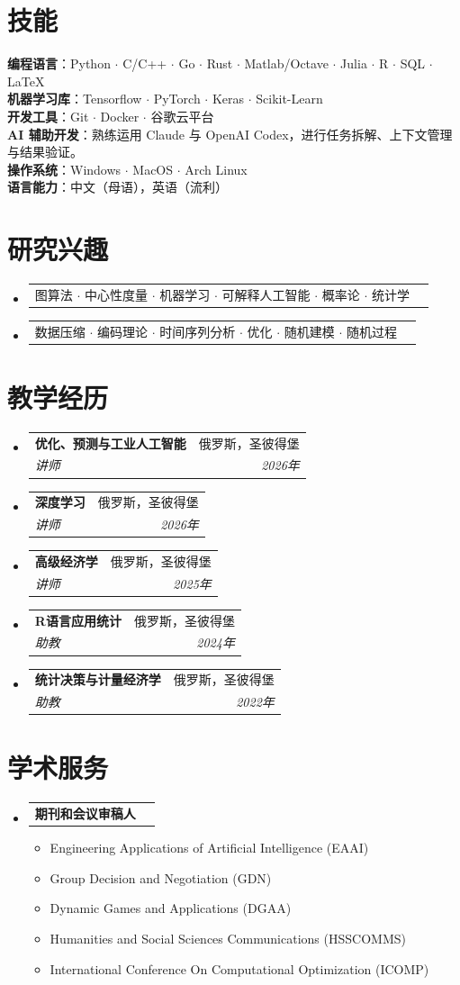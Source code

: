 \documentclass[letterpaper,10pt,fontset=none]{ctexart}
\makeatletter
\newcommand{\resumeItem}[1]{
  \item\small{
    {#1 \vspace{-2pt}}
  }
}
\newcommand{\resumeSubheading}[4]{
  \vspace{-2pt}\item
  \begin{tabular*}{0.97\textwidth}[t]{l@{\extracolsep{\fill}}r}
    \textbf{#1} & #2 \\
    \textit{\small#3} & \textit{\small #4} \\
  \end{tabular*}\vspace{-7pt}
}
\newcommand{\resumeProjectHeading}[2]{
  \item
  \begin{tabular*}{0.97\textwidth}{l@{\extracolsep{\fill}}r}
    \small#1 & #2 \\
  \end{tabular*}\vspace{-7pt}
}
\newenvironment{resumeSubHeadingList}{\begin{itemize}[leftmargin=0.15in, label={}]}{\end{itemize}}
\newenvironment{resumeItemList}{\begin{itemize}}{\end{itemize}}
\makeatother
\begin{document}
\section{技能}
\begin{itemize}[leftmargin=0.15in, label={}]
  \small{\item{
        \textbf{编程语言}{：Python $\cdot$ C/C++ $\cdot$ Go $\cdot$ Rust $\cdot$ Matlab/Octave $\cdot$ Julia $\cdot$ R $\cdot$ SQL $\cdot$ \LaTeX} \\
        \textbf{机器学习库}{：Tensorflow $\cdot$  PyTorch $\cdot$ Keras $\cdot$  Scikit-Learn} \\
        \textbf{开发工具}{：Git $\cdot$ Docker $\cdot$  谷歌云平台} \\
        \textbf{AI 辅助开发}{：熟练运用 Claude 与 OpenAI Codex，进行任务拆解、上下文管理与结果验证。} \\
        \textbf{操作系统}{：Windows $\cdot$ MacOS $\cdot$ Arch Linux} \\
        \textbf{语言能力}{：中文（母语），英语（流利）}
        }}
\end{itemize}

\section{研究兴趣}
\begin{resumeSubHeadingList}
  \resumeProjectHeading{
    图算法 $\cdot$ 中心性度量 $\cdot$ 机器学习
    $\cdot$ 可解释人工智能 $\cdot$ 概率论
    $\cdot$ 统计学}{}
  \resumeProjectHeading{
    数据压缩 $\cdot$ 编码理论 $\cdot$ 时间序列分析 $\cdot$
    优化 $\cdot$ 随机建模 $\cdot$ 随机过程}{}
\end{resumeSubHeadingList}
\section{教学经历}
\begin{resumeSubHeadingList}
  \resumeSubheading{优化、预测与工业人工智能}{俄罗斯，圣彼得堡}{讲师}{2026年}
  \resumeSubheading{深度学习}{俄罗斯，圣彼得堡}{讲师}{2026年}
  \resumeSubheading{高级经济学}{俄罗斯，圣彼得堡}{讲师}{2025年}
  \resumeSubheading{R语言应用统计}{俄罗斯，圣彼得堡}{助教}{2024年}
  \resumeSubheading{统计决策与计量经济学}{俄罗斯，圣彼得堡}{助教}{2022年}
\end{resumeSubHeadingList}

\section{学术服务}
\begin{resumeSubHeadingList}
  \resumeProjectHeading{{\bf 期刊和会议审稿人}}{}
  \begin{resumeItemList}
    \resumeItem{Engineering Applications of Artificial Intelligence (EAAI)}
    \resumeItem{Group Decision and Negotiation (GDN)}
    \resumeItem{Dynamic Games and Applications (DGAA)}
    \resumeItem{Humanities and Social Sciences Communications (HSSCOMMS)}
    \resumeItem{International Conference On Computational Optimization (ICOMP)}
  \end{resumeItemList}
\end{resumeSubHeadingList}
\end{document}
